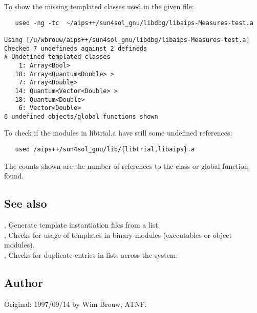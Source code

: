 To show the missing templated classes used in the given file:

\begin{verbatim}
   used -ng -tc  ~/aips++/sun4sol_gnu/libdbg/libaips-Measures-test.a

Using [/u/wbrouw/aips++/sun4sol_gnu/libdbg/libaips-Measures-test.a]
Checked 7 undefineds against 2 defineds
# Undefined templated classes
    1: Array<Bool>
   18: Array<Quantum<Double> >
    7: Array<Double>
   14: Quantum<Vector<Double> >
   18: Quantum<Double>
    6: Vector<Double>
6 undefined objects/global functions shown
\end{verbatim}

To check if the modules in libtrial.a have still some undefined references:

\begin{verbatim}
   used /aips++/sun4sol_gnu/lib/{libtrial,libaips}.a
\end{verbatim}

The counts shown are the number of references to the class or global function
found.

\subsection*{See also}

, Generate template instantiation files from a list.\\
, Checks for usage of templates in binary modules (executables
or object modules).\\
, Checks for duplicate entries in  lists
   across the system.

\subsection*{Author}

Original: 1997/09/14 by Wim Brouw, ATNF.
